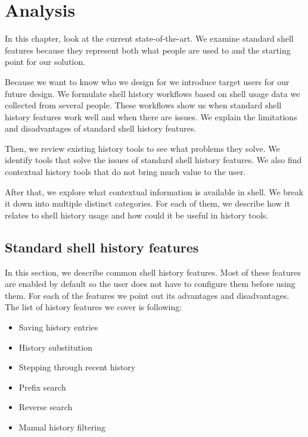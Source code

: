 

\chapter{Analysis}

In this chapter, look at the current state-of-the-art. 
We examine standard shell features because they represent both what people are used to and the starting point for our solution.

Because we want to know who we design for we introduce target users for our future design. We formulate shell history workflows based on shell usage data we collected from several people. %
These workflows show us when standard shell history features work well and when there are issues. We explain the limitations and disadvantages of standard shell history features.

Then, we review existing history tools to see what problems they solve. We identify tools that solve the issues of standard shell history features. We also find contextual history tools that do not bring much value to the user.

After that, we explore what contextual information is available in shell. We break it down into multiple distinct categories. For each of them, we describe how it relates to shell history usage and how could it be useful in history tools.


\section{Standard shell history features}

In this section, we describe common shell history features. Most of these features are enabled by default so the user does not have to configure them before using them.
For each of the features we point out its advantages and disadvantages.
The list of history features we cover is following:

\begin{itemize}
    \item Saving history entries
    \item History substitution
    \item Stepping through recent history
    \item Prefix search
    \item Reverse search
    \item Manual history filtering
\end{itemize}


